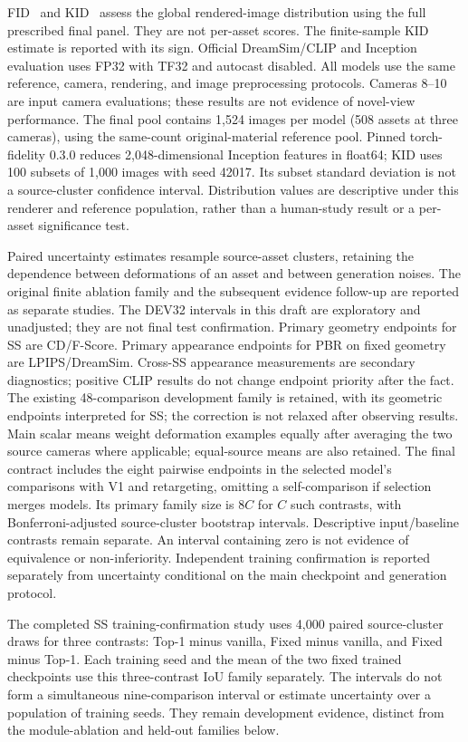 \documentclass[10pt]{article}
\begin{document}
FID~\cite{heusel2017fid} and KID~\cite{binkowski2018kid} assess the global rendered-image distribution using the full
prescribed final panel. They are not per-asset scores. The finite-sample KID
estimate is reported with its sign. Official DreamSim/CLIP and Inception evaluation
uses FP32 with TF32 and autocast disabled. All models use the same reference,
camera, rendering, and image preprocessing protocols. Cameras 8--10 are input
camera evaluations; these results are not evidence of novel-view performance.
The final pool contains 1,524 images per model (508 assets at three cameras),
using the same-count original-material reference pool. Pinned
torch-fidelity 0.3.0 reduces 2,048-dimensional Inception features in
float64; KID uses 100 subsets of 1,000 images with seed 42017. Its subset
standard deviation is not a source-cluster confidence interval. Distribution
values are descriptive under this renderer and reference population, rather
than a human-study result or a per-asset significance test.

Paired uncertainty estimates resample source-asset clusters, retaining the
dependence between deformations of an asset and between generation noises.
The original finite ablation family and the subsequent evidence follow-up
are reported as separate studies. The DEV32 intervals in this draft are
exploratory and unadjusted; they are not final test confirmation. Primary
geometry endpoints for SS are CD/F-Score. Primary appearance endpoints for
PBR on fixed geometry are LPIPS/DreamSim. Cross-SS appearance measurements
are secondary diagnostics; positive CLIP results do not change endpoint
priority after the fact. The existing 48-comparison development family is
retained, with its geometric endpoints interpreted for SS; the correction
is not relaxed after observing results.
Main scalar means weight deformation examples equally after averaging the
two source cameras where applicable; equal-source means are also retained.
The final contract includes the eight pairwise endpoints in the selected
model's comparisons with V1 and retargeting, omitting a self-comparison if
selection merges models. Its primary family size is $8C$ for $C$ such
contrasts, with Bonferroni-adjusted source-cluster bootstrap intervals.
Descriptive input/baseline contrasts remain separate. An interval containing
zero is not evidence of equivalence or non-inferiority. Independent training
confirmation is reported separately from uncertainty conditional on the main
checkpoint and generation protocol.

The completed SS training-confirmation study uses 4,000 paired source-cluster
draws for three contrasts: Top-1 minus vanilla, Fixed minus vanilla, and
Fixed minus Top-1. Each training seed and the mean of the two fixed trained
checkpoints use this three-contrast IoU family separately. The intervals do
not form a simultaneous nine-comparison interval or estimate uncertainty
over a population of training seeds. They remain development evidence,
distinct from the module-ablation and held-out families below.
\end{document}
